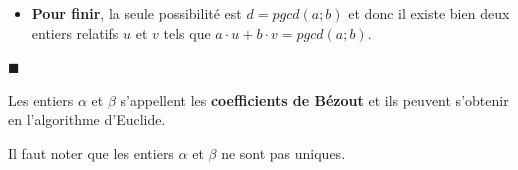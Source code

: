 \begin{demonstration}
\begin{itemize}
	Comme $r = 0$, on a que $d$ divise $a$. Similairement, on peut montrer de même que $d$ divise $b$.
	
	Comme $d$ divise $a$ et $d$ divise $b$ on a $d \le pgcd(a;b)$.
	
	\item \textbf{Pour finir}, la seule possibilité est $d = pgcd(a;b)$ et donc il existe bien deux entiers relatifs $u$ et $v$ tels que $a \cdot u + b \cdot v = pgcd(a;b)$.
	
\end{itemize}
\vspace{-3mm}\hfill $\blacksquare$
\end{demonstration}	


\medskip

\begin{remarques}
	\item Les entiers $\alpha$ et $\beta$ s'appellent les \textbf{coefficients de Bézout} et ils peuvent s’obtenir en  l'algorithme d'Euclide.
	
	\item Il faut noter que les entiers $\alpha$ et $\beta$ ne sont pas uniques.
\end{remarques}


